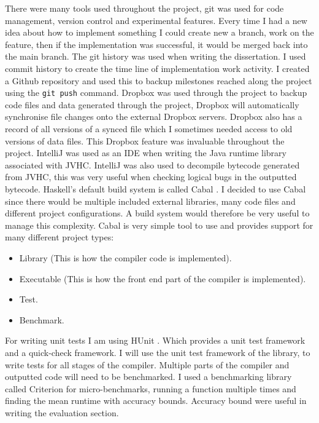 \documentclass[float=false, crop=false]{standalone}
\begin{document}
There were many tools used throughout the project, git was used for 
code management, version control and experimental features. Every time
I had a new idea about how to implement something I could create new a 
branch, work on the feature, then if the implementation was successful, 
it would be merged back into the main branch. 
The git history was used when writing the dissertation.
I used commit history to create the time line
of implementation work activity. 
I created a Github repository and used this to backup milestones reached 
along the project using the \verb|git push| command.
Dropbox was used through the project to backup code files and data generated 
through the project, Dropbox will automatically synchronise file changes
onto the external Dropbox servers. Dropbox also has a record of all
versions of a synced file which I sometimes needed access to old versions
of data files. This Dropbox feature was invaluable throughout the project.
IntelliJ \cite{intellij-ide} was used as an IDE when writing the Java
runtime library associated with JVHC. IntelliJ was also used to decompile
bytecode generated from JVHC, this was very useful when checking logical
bugs in the outputted bytecode.
Haskell's default build system is called Cabal \cite{cabal}. I 
decided to use Cabal since there would be multiple included external libraries,
many code files and different project configurations.
A build system would therefore be very useful to manage this
complexity. Cabal is very simple tool to use and provides support
for many different project types:
  \begin{itemize}
    \item Library (This is how the compiler code is implemented).

    \item Executable (This is how the front end part of the compiler is 
      implemented).

    \item Test.

    \item Benchmark.
  \end{itemize}
For writing unit tests I am using HUnit \cite{hunit}.
Which provides a unit test framework and a quick-check framework. 
I will use the unit test framework of the library, 
to write tests for all stages of the compiler.
Multiple parts of the compiler and outputted code will
need to be benchmarked. I used a benchmarking library called
Criterion \cite{criterion} for micro-benchmarks, running a function
multiple times and finding the mean runtime with accuracy bounds.
Accuracy bound were useful in writing the evaluation section.
\end{document}
